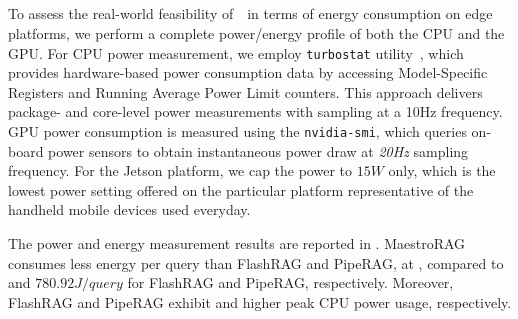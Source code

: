 \subsection{}
To assess the real-world feasibility of \MR~\,in terms of energy consumption on edge platforms, we perform a complete power/energy profile of both the CPU and the GPU.
For CPU 
power measurement, we employ \texttt{turbostat} utility~\cite{turbostat}, which provides hardware-based power consumption data by accessing Model-Specific Registers and Running Average Power Limit counters. This approach delivers package- and core-level power measurements with sampling at a 10Hz frequency.  GPU power consumption is measured using the \texttt{nvidia-smi}, which queries on-board power sensors to obtain instantaneous power draw at \emph{20Hz} sampling frequency. For the Jetson platform, we cap the power to $15W$ only, which is the lowest power setting offered on the particular platform representative of the handheld mobile devices used everyday.

The power and energy measurement results are reported in . MaestroRAG consumes less energy per query than FlashRAG and PipeRAG, at , compared to  and $780.92J/query$ for FlashRAG and PipeRAG, respectively. Moreover, FlashRAG and PipeRAG exhibit  and  higher peak CPU power usage, respectively.

